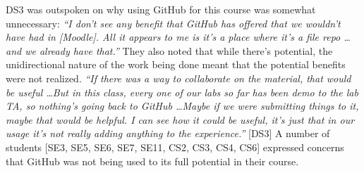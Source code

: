 DS3 was outspoken on why using GitHub for this course was somewhat unnecessary: \textit{``I don't see any benefit that GitHub has offered that we wouldn't have had in [Moodle]. All it appears to me is it's a place where it's a file repo \ldots and we already have that.''} They also noted that while there's potential, the unidirectional nature of the work being done meant that the potential benefits were not realized. \textit{``If there was a way to collaborate on the material, that would be useful \ldots But in this class, every one of our labs so far has been demo to the lab TA, so nothing's going back to GitHub \ldots Maybe if we were submitting things to it, maybe that would be helpful. I can see how it could be useful, it's just that in our usage it's not really adding anything to the experience.''} [DS3] A number of students [SE3, SE5, SE6, SE7, SE11, CS2, CS3, CS4, CS6] expressed concerns that GitHub was not being used to its full potential in their course.



